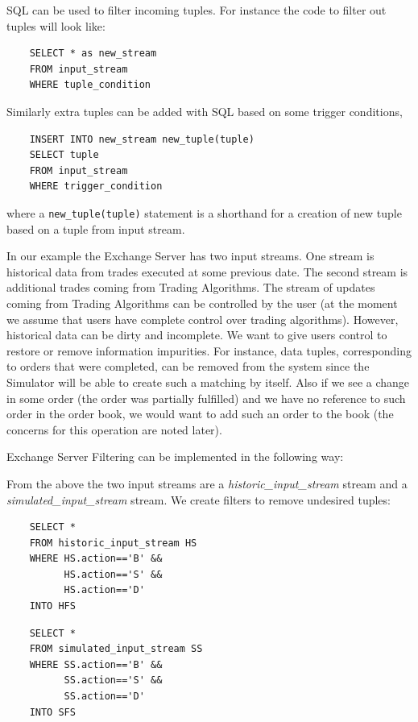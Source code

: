 \documentclass{article}
\begin{document}
\noindent SQL can be used to filter incoming tuples. For instance the code to filter out tuples will look like:

\begin{verbatim}   
    SELECT * as new_stream
    FROM input_stream
    WHERE tuple_condition
\end{verbatim}

\noindent Similarly extra tuples can be added with SQL based on some trigger conditions,

\begin{verbatim}   
    INSERT INTO new_stream new_tuple(tuple)
    SELECT tuple
    FROM input_stream
    WHERE trigger_condition
\end{verbatim}

\noindent where a {\tt new\_tuple(tuple)} statement is a shorthand for a creation of new tuple based on a tuple from input stream.

In our example the Exchange Server has two input streams. One stream is historical data from trades executed at some previous date. The second stream is additional trades coming from Trading Algorithms. The stream of updates coming from Trading Algorithms can be controlled by the user (at the moment we assume that users have complete control over trading algorithms). However, historical data can be dirty and incomplete. We want to give users control to restore or remove information impurities. For instance, data tuples, corresponding to orders that were completed, can be removed from the system since the Simulator will be able to create such a matching by itself. Also if we see a change in some order (the order was partially fulfilled) and we have no reference to such order in the order book, we would want to add such an order to the book (the concerns for this operation are noted later).

Exchange Server Filtering can be implemented in the following way:

From the above the two input streams  are a \emph{historic\_input\_stream} stream and a \emph{simulated\_input\_stream} stream. We create filters to remove undesired tuples:

\begin{verbatim}   
    SELECT * 
    FROM historic_input_stream HS
    WHERE HS.action=='B' &&
          HS.action=='S' &&
          HS.action=='D'
    INTO HFS
\end{verbatim}

\begin{verbatim}  
    SELECT *
    FROM simulated_input_stream SS
    WHERE SS.action=='B' &&
          SS.action=='S' &&
          SS.action=='D'
    INTO SFS
\end{verbatim}
\end{document}
